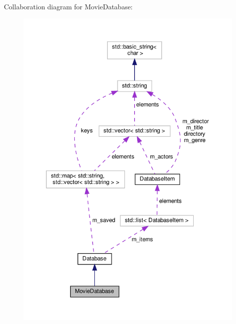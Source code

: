 Collaboration diagram for Movie\+Database\+:\nopagebreak
\begin{figure}[H]
\begin{center}
\leavevmode
\includegraphics[width=350pt]{classMovieDatabase__coll__graph}
\end{center}
\end{figure}
